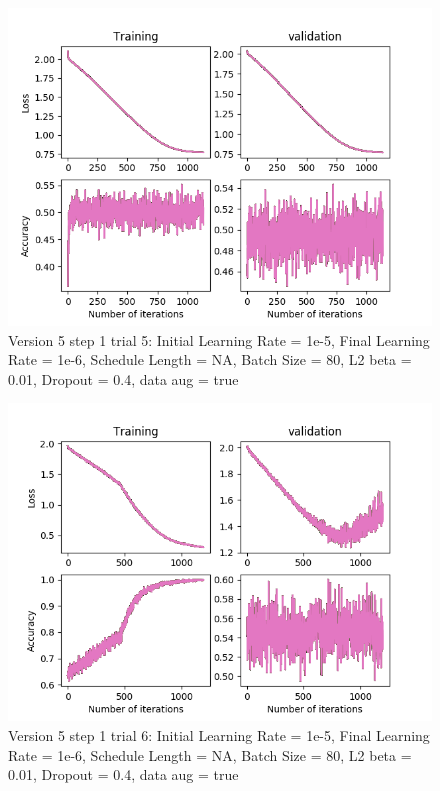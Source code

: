 \documentclass[12pt,reqno]{amsart}
\numberwithin{equation}{section}
\begin{document}
\begin{enumerate}
\begin{figure}[H]
\centering
\includegraphics[scale=0.6]{data12_version5_step1_trial5}
\caption{Version 5 step 1 trial 5: Initial Learning Rate = 1e-5, Final Learning Rate = 1e-6, Schedule Length = NA, Batch Size = 80, L2 beta = 0.01, Dropout = 0.4, data aug = true}
\end{figure}

\begin{figure}[H]
\centering
\includegraphics[scale=0.6]{data12_version5_step1_trial6}
\caption{Version 5 step 1 trial 6: Initial Learning Rate = 1e-5, Final Learning Rate = 1e-6, Schedule Length = NA, Batch Size = 80, L2 beta = 0.01, Dropout = 0.4, data aug = true}
\end{figure}


\end{enumerate}
\end{document}
